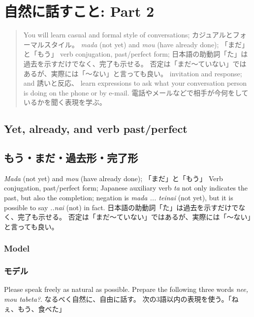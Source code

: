 \documentclass[uplatex,dvipdfmx,b5paper,english,10pt]{jsbook}
\begin{document}
\chapter{自然に話すこと: Part 2}
\fi

\begin{abstract}
\ifEnglish
You will learn casual and formal style of conversations;
\else
カジュアルとフォーマルスタイル。
\fi
\ifEnglish
{\it mada\/} (not yet) and {\it mou\/} (have already done);
\else
「まだ」と「もう」
\fi
\ifEnglish
verb conjugation, past/perfect form;
\else
日本語の助動詞「た」は過去を示すだけでなく、完了も示せる。
否定は「まだ〜ていない」ではあるが、実際には「〜ない」と言っても良い。
\fi
\ifEnglish
invitation and response; and
\else
誘いと反応、
\fi
\ifEnglish
learn expressions to ask what your conversation person is doing on the phone or by e-mail.
\else
電話やメールなどで相手が今何をしているかを聞く表現を学ぶ。
\fi
\end{abstract}


\ifEnglish
\section{Yet, already, and verb past/perfect}
\else
\section{もう・まだ・過去形・完了形}
\fi


\ifEnglish
{\it Mada\/} (not yet) and {\it mou\/} (have already done);
\else
「まだ」と「もう」
\fi
\ifEnglish
Verb conjugation, past/perfect form;
Japanese auxiliary verb {\it ta\/} not only indicates the past, but also the completion;
negation is {\it mada ... teinai\/} (not yet), but it is possible to say {\it ..nai\/} (not) in fact.
\else
日本語の助動詞「た」は過去を示すだけでなく、完了も示せる。
否定は「まだ〜ていない」ではあるが、実際には「〜ない」と言っても良い。
\fi

\ifEnglish
\subsection{Model}
\else
\subsection{モデル}
\fi

\begin{toiquestion}
\ifEnglish
Please speak freely as natural as possible.
Prepare the following three words {\it nee, mou tabeta?\/}.
\else
なるべく自然に、自由に話す。
次の3語以内の表現を使う。「ねぇ、もう、食べた」
\fi
\end{toiquestion}
\end{document}
